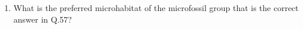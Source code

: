 \documentclass[12pt,fleqn]{article}
\theoremstyle{remark}
\begin{document}
\begin{enumerate}[label=Q.\arabic*.]
            \begin {enumerate}
            \end{enumerate}
    \item What is the preferred microhabitat of the microfossil group that is the correct answer in Q.57? \hfill{} 
            \begin {enumerate}
            \end{enumerate}

\end{enumerate}
\end{document}
